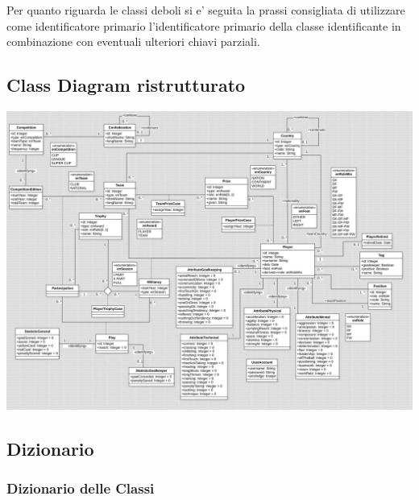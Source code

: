 Per quanto riguarda le classi deboli si e' seguita la prassi consigliata di utilizzare come
identificatore primario l'identificatore primario della classe identificante in combinazione con
eventuali ulteriori chiavi parziali.

\newpage
\subsection{Class Diagram ristrutturato}
\includegraphics[width=\textwidth]{res/class_diagram_ristr}
\newpage

\subsection{Dizionario}

\subsubsection{Dizionario delle Classi}



